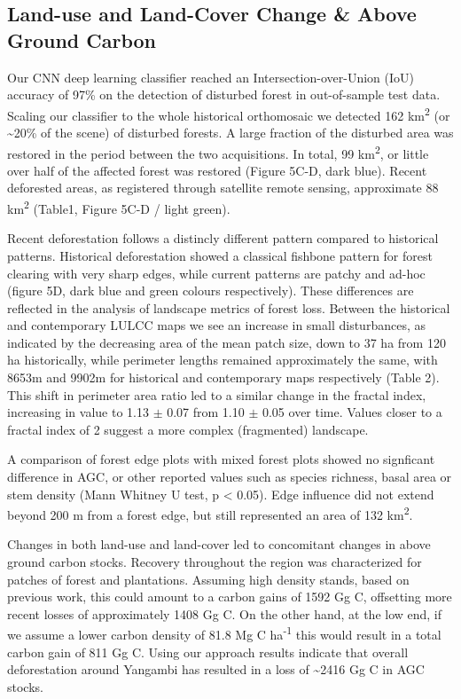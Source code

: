 \documentclass[remote sensing,article,submit,moreauthors,pdftex,10pt,a4paper]{mdpi}
\begin{document}
\hypertarget{land-use-and-land-cover-change-above-ground-carbon}{%
\subsection{Land-use and Land-Cover Change \& Above Ground
Carbon}\label{land-use-and-land-cover-change-above-ground-carbon}}

Our CNN deep learning classifier reached an Intersection-over-Union
(IoU) accuracy of 97\% on the detection of disturbed forest in
out-of-sample test data. Scaling our classifier to the whole historical
orthomosaic we detected 162 km\textsuperscript{2} (or
\textasciitilde{}20\% of the scene) of disturbed forests. A large
fraction of the disturbed area was restored in the period between the
two acquisitions. In total, 99 km\textsuperscript{2}, or little over
half of the affected forest was restored (Figure 5C-D, dark blue).
Recent deforested areas, as registered through satellite remote sensing,
approximate 88 km\textsuperscript{2} (Table1, Figure 5C-D / light
green).

Recent deforestation follows a distincly different pattern compared to
historical patterns. Historical deforestation showed a classical
fishbone pattern for forest clearing with very sharp edges, while
current patterns are patchy and ad-hoc (figure 5D, dark blue and green
colours respectively). These differences are reflected in the analysis
of landscape metrics of forest loss. Between the historical and
contemporary LULCC maps we see an increase in small disturbances, as
indicated by the decreasing area of the mean patch size, down to 37 ha
from 120 ha historically, while perimeter lengths remained approximately
the same, with 8653m and 9902m for historical and contemporary maps
respectively (Table 2). This shift in perimeter area ratio led to a
similar change in the fractal index, increasing in value to 1.13 \(\pm\)
0.07 from 1.10 \(\pm\) 0.05 over time. Values closer to a fractal index
of 2 suggest a more complex (fragmented) landscape.

A comparison of forest edge plots with mixed forest plots showed no
signficant difference in AGC, or other reported values such as species
richness, basal area or stem density (Mann Whitney U test, p \textless{}
0.05). Edge influence did not extend beyond 200 m from a forest edge,
but still represented an area of 132 km\textsuperscript{2}.

Changes in both land-use and land-cover led to concomitant changes in
above ground carbon stocks. Recovery throughout the region was
characterized for patches of forest and plantations. Assuming high
density stands, based on previous work, this could amount to a carbon
gains of 1592 Gg C, offsetting more recent losses of approximately 1408
Gg C. On the other hand, at the low end, if we assume a lower carbon
density of 81.8 Mg C ha\textsuperscript{-1} this would result in a total
carbon gain of 811 Gg C. Using our approach results indicate that
overall deforestation around Yangambi has resulted in a loss of
\textasciitilde{}2416 Gg C in AGC stocks.
\end{document}
